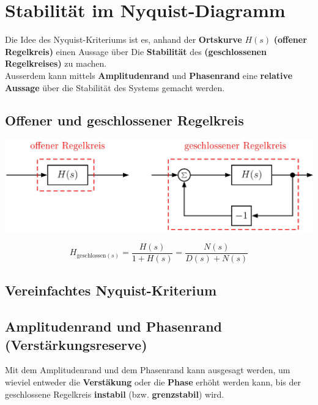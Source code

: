 \section{Stabilität im Nyquist-Diagramm}

Die Idee des Nyquist-Kriteriums ist es, anhand der \textbf{Ortskurve} $H(s)$ \textbf{(offener Regelkreis)} einen Aussage über Die
\textbf{Stabilität} des \textbf{(geschlossenen Regelkreises)} zu machen. \\
Ausserdem kann mittels \textbf{Amplitudenrand} und \textbf{Phasenrand} eine \textbf{relative Aussage} über die Stabilität
des Systems gemacht werden.


\subsection{Offener und geschlossener Regelkreis}

\includegraphics[width=0.75\columnwidth]{images/offener_geschlossener_regelkreis.png}

$$ H_{\text{geschlossen}(s)} = \frac{H(s)}{1 + H(s)} = \frac{N(s)}{D(s) + N(s)} $$


\subsection{Vereinfachtes Nyquist-Kriterium}



\subsection{Amplitudenrand und Phasenrand (Verstärkungsreserve)}

Mit dem Amplitudenrand und dem Phasenrand kann ausgesagt werden, um wieviel entweder die \textbf{Verstäkung} oder die \textbf{Phase}
erhöht werden kann, bis der geschlossene Regelkreis \textbf{instabil} (bzw. \textbf{grenzstabil}) wird.

